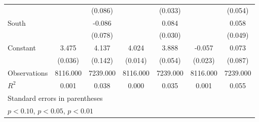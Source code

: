 {\begin{tabular}{l*{6}{c}}
                    &                     &     (0.086)         &                     &     (0.033)         &                     &     (0.054)         \\
\addlinespace
South               &                     &      -0.086         &                     &       0.084\sym{***}&                     &       0.058         \\
                    &                     &     (0.078)         &                     &     (0.030)         &                     &     (0.049)         \\
\addlinespace
Constant            &       3.475\sym{***}&       4.137\sym{***}&       4.024\sym{***}&       3.888\sym{***}&      -0.057\sym{**} &       0.073         \\
                    &     (0.036)         &     (0.142)         &     (0.014)         &     (0.054)         &     (0.023)         &     (0.087)         \\
\midrule
Observations        &    8116.000         &    7239.000         &    8116.000         &    7239.000         &    8116.000         &    7239.000         \\
\(R^{2}\)           &       0.001         &       0.038         &       0.000         &       0.035         &       0.001         &       0.055         \\
\bottomrule
\multicolumn{7}{l}{\footnotesize Standard errors in parentheses}\\
\multicolumn{7}{l}{\footnotesize \sym{*} \(p<0.10\), \sym{**} \(p<0.05\), \sym{***} \(p<0.01\)}\\
\end{tabular}
}
